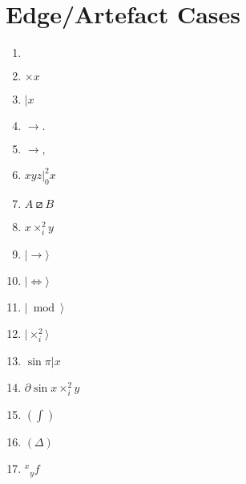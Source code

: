 \documentclass{article}
\begin{document}
\section{Edge/Artefact Cases}
\begin{enumerate}
  \item $\,$  %
  \item $\times x$ %
  \item $\mathbin{|} x$ %
  \item $\rightarrow.$
  \item $\rightarrow,$
  \item $\left. xyz \right|_0^2 x$
  \item $ A \boxslash B $
  \item $ x \times_i^2 y $ %
  \item $| \rightarrow \rangle$ %
  \item $| \iff \rangle$ %
  \item $| \bmod \rangle$ %
  \item $| \times_i^2 \rangle$ %
  \item $\sin \pi | x$ %
  \item $\partial \sin x\times_i^2 y $ %
  \item $ ( \int ) $ %
  \item $ ( \Delta ) $ %
  \item $ {}^x{}_y f$ %
\end{enumerate}
\end{document}
